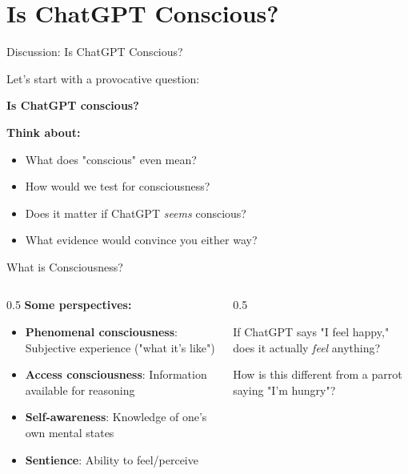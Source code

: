 \documentclass[aspectratio=169]{beamer}
\begin{document}
\section{Is ChatGPT Conscious?}

\begin{frame}{Discussion: Is ChatGPT Conscious? 🤖💭}
\small
\begin{discussion}
Let's start with a provocative question:
\vspace{0.3cm}

\Large{\textbf{Is ChatGPT conscious?}}
\end{discussion}

\vspace{0.3cm}

\textbf{Think about:}
\begin{itemize}\setlength{\itemsep}{0pt}
    \item What does "conscious" even mean?
    \item How would we test for consciousness?
    \item Does it matter if ChatGPT \textit{seems} conscious?
    \item What evidence would convince you either way?
\end{itemize}
\end{frame}

\begin{frame}{What is Consciousness? 🧠}
\small
\begin{columns}
\begin{column}{0.5\textwidth}
\textbf{Some perspectives:}
\begin{itemize}\setlength{\itemsep}{0pt}
    \item \textbf{Phenomenal consciousness}: Subjective experience ("what it's like")
    \item \textbf{Access consciousness}: Information available for reasoning
    \item \textbf{Self-awareness}: Knowledge of one's own mental states
    \item \textbf{Sentience}: Ability to feel/perceive
\end{itemize}
\end{column}

\begin{column}{0.5\textwidth}
\begin{thinkaboutit}
If ChatGPT says "I feel happy," does it actually \textit{feel} anything?

How is this different from a parrot saying "I'm hungry"?
\end{thinkaboutit}
\end{column}
\end{columns}
\end{frame}
\end{document}
